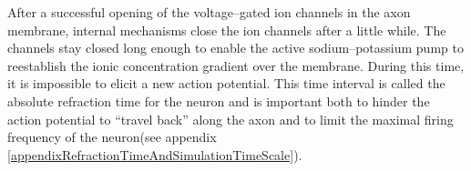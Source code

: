 		After a successful opening of the voltage--gated ion channels in the axon membrane, internal mechanisms close the ion channels after a little while.
		The channels stay closed long enough to enable the active sodium--potassium pump to reestablish the ionic concentration gradient over the membrane.
		During this time, it is impossible to elicit a new action potential.
		This time interval is called the absolute refraction time for the neuron and is important both to hinder the action potential to ``travel back'' along the axon\cite{NeuroscienceExploringTheBrain3edKAP4} and to limit the maximal firing frequency of the neuron(see appendix \ref{appendixRefractionTimeAndSimulationTimeScale}). %


%		


	
